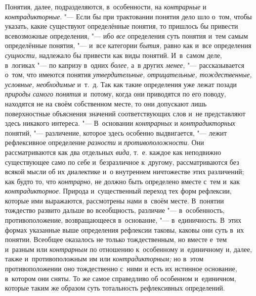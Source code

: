 Понятия, далее, подразделяются, в~особенности, на {\em контрарные} и
{\em контрадикторные}. "--- Если бы при трактовании понятия дело шло о~том,
чтобы указать, какие существуют определённые понятия, то пришлось бы привести
всевозможные определения, "--- ибо {\em все} определения суть понятия и~тем
самым определённые понятия, "--- и~все категории {\em бытия,} равно как и~все
определения {\em сущности,} надлежало бы привести как виды понятий. И~в~самом
деле, в~логиках "--- по капризу в~одних {\em более,} а~в других {\em менее,}
"--- рассказывается о~том, что имеются понятия {\em утвердительные,
отрицательные, тождественные, условные, необходимые} и~т.~д. Так как такие
определения уже лежат позади {\em природы самого понятия} и~потому, когда они
приводятся по его поводу, находятся не на своём собственном месте, то они
допускают лишь поверхностные объяснения значений соответствующих слов и~не
представляют здесь никакого интереса. "--- В~основании {\em контрарных} и {\em
контрадикторных} понятий, "--- различение, которое здесь особенно выдвигается,
"--- лежит рефлексивное определение {\em разности} и {\em противоположности}.
Они рассматриваются как два отдельных {\em вида,} т.~е. каждое как неподвижно
существующее само по себе и~безразличное к~другому, рассматриваются без всякой
мысли об их диалектике и~о внутреннем ничтожестве этих различений; как будто то,
что {\em контрарно,} не должно быть определено вместе с~тем и~как {\em
контрадикторное}. Природа и~существенный переход тех форм рефлексии, которые
ими выражаются, рассмотрены нами в~своём месте. В~понятии тождество развито
дальше во всеобщность, различие "--- в~особенность, противоположение,
возвращающееся в~основание, "--- в~единичность. В~этих формах указанные выше
определения рефлексии таковы, каковы они суть в~их понятии. Всеобщее оказалось
не только тождественным, но вместе е~тем и~разным или {\em контрарным} по
отношению к~особенному и~единичному и, далее, также и~противоположным им или
{\em контрадикторным;} но в~этом противоположении оно тождественно с~ними и
есть их истинное основание, в~котором они сняты. То же самое
справедливо об особенном и~единичном, которые таким же
образом суть тотальность рефлексивных определений.

